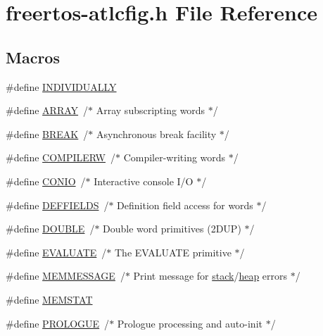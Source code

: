 \hypertarget{freertos-atlcfig_8h}{}\section{freertos-\/atlcfig.h File Reference}
\label{freertos-atlcfig_8h}
\subsection*{Macros}
\begin{DoxyCompactItemize}
\item 
\#define \hyperlink{freertos-atlcfig_8h_a48c036bd8ba1fdc29f0981ff7ee3d9b5}{I\+N\+D\+I\+V\+I\+D\+U\+A\+L\+LY}
\item 
\#define \hyperlink{freertos-atlcfig_8h_af579248b8d4c16c0aeba3dff9ee8b10a}{A\+R\+R\+AY}~/$\ast$ Array subscripting words $\ast$/
\item 
\#define \hyperlink{freertos-atlcfig_8h_abe022c8f09db1f0680a92293523f25dd}{B\+R\+E\+AK}~/$\ast$ Asynchronous break facility $\ast$/
\item 
\#define \hyperlink{freertos-atlcfig_8h_a6e870e0dd56eee50bae52b101eb2634d}{C\+O\+M\+P\+I\+L\+E\+RW}~/$\ast$ Compiler-\/writing words $\ast$/
\item 
\#define \hyperlink{freertos-atlcfig_8h_a1dd720c7eba235287553f1628c4687e8}{C\+O\+N\+IO}~/$\ast$ Interactive console I/O $\ast$/
\item 
\#define \hyperlink{freertos-atlcfig_8h_a5e8c22a8ef7ae74e64818fed0e1427e5}{D\+E\+F\+F\+I\+E\+L\+DS}~/$\ast$ Definition field access for words $\ast$/
\item 
\#define \hyperlink{freertos-atlcfig_8h_a8747af38b86aa2bbcda2f1b1aa0888c2}{D\+O\+U\+B\+LE}~/$\ast$ Double word primitives (2\+D\+U\+P) $\ast$/
\item 
\#define \hyperlink{freertos-atlcfig_8h_ad3787f1b5599150eab9d3ca887d75640}{E\+V\+A\+L\+U\+A\+TE}~/$\ast$ The E\+V\+A\+L\+U\+A\+TE primitive $\ast$/
\item 
\#define \hyperlink{freertos-atlcfig_8h_a3a12ced9ae9a894dbc0a31282e769d63}{M\+E\+M\+M\+E\+S\+S\+A\+GE}~/$\ast$ Print message for \hyperlink{FreeRTOS_2atlast_8c_a119bff668c1f986f35cdc8a167c756bb}{stack}/\hyperlink{FreeRTOS_2atlast_8c_a631c4c438b300c6392fe526a50a041c3}{heap} errors $\ast$/
\item 
\#define \hyperlink{freertos-atlcfig_8h_a90dbf4dc4f15c07ffcf27e0b757187a7}{M\+E\+M\+S\+T\+AT}
\item 
\#define \hyperlink{freertos-atlcfig_8h_a59f8a4119207355f67b920d35ec6cc8e}{P\+R\+O\+L\+O\+G\+UE}~/$\ast$ Prologue processing and auto-\/init $\ast$/

\end{DoxyCompactItemize}
